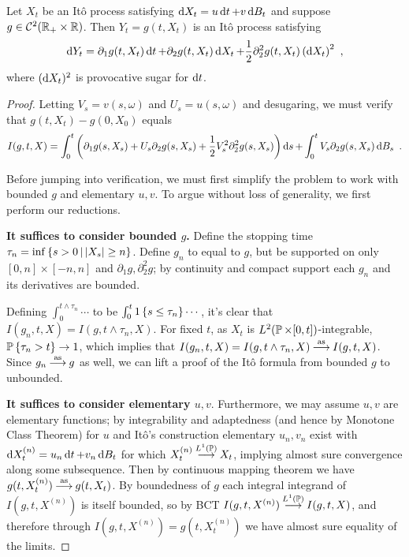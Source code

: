 \documentclass{article}
\begin{document}
\begin{theorem}
  Let \(X_t\) be an It\^{o} process satisfying \(\d{X_t}=u \d{t}+v\d{B_t}\) and suppose \(g\in\mcC^2(\R_+\times\R)\). Then \(Y_t=g(t, X_t)\) is an It\^{o} process satisfying
  \[
   \d{Y_t}=\partial_1g(t, X_t)\d{t}+\partial_2g(t, X_t)\d{X_t}+\frac{1}{2}\partial_2^2g(t, X_t)\pa{\d{X_t}}^2 \,\,,
  \]
  where \((\d{X_t})^2\) is provocative sugar for \(\d{t}\).
\end{theorem}
\begin{proof}
  Letting \(V_s=v(s, \omega)\) and \(U_s=u(s, \omega)\) and desugaring, we must verify that \(g(t, X_t)-g(0, X_0)\) equals
  \[
   I(g, t, X)=\int_0^t\pa{\partial_1g(s,X_s)+U_s\partial_2g(s, X_s)+\frac{1}{2}V_s^2\partial_2^2g(s, X_s)}\d{s}+\int_0^tV_s\partial_2g(s,X_s)\d{B_s}\,\,.
  \]

  Before jumping into verification, we must first simplify the problem to work with bounded \(g\) and elementary \(u,v\). To argue without loss of generality, we first perform our reductions.

  \textbf{It suffices to consider bounded \(g\).} Define the stopping time \(\tau_n=\inf\set{s>0}{\abs{X_s}\ge n}\). Define \(g_n\) to equal to \(g\), but be supported on only \([0,n]\times[-n,n]\) and \(\partial_1g,\partial_2^2g\); by continuity and compact support each \(g_n\) and its derivatives are bounded.

  Defining \(\int_0^{t\land \tau_n}\cdots\) to be \(\int_0^{t}1\ca{s\le \tau_n}\cdots\), it's clear that \(I(g_n, t, X)=I(g,t\land \tau_n, X)\). For fixed \(t\), as \(X_t\) is \(L^2(\P\times [0,t])\)-integrable, \(\P\ca{\tau_n>t}\rightarrow 1\), which implies that \(I(g_n,t, X)=I(g, t\land \tau_n, X)\convas I(g, t, X)\). Since \(g_n\convas g\) as well, we can lift a proof of the It\^{o} formula from bounded \(g\) to unbounded.

\textbf{It suffices to consider elementary \(u,v\)}.
Furthermore, we may assume \(u,v\) are elementary functions; by integrability and adaptedness (and hence by Monotone Class Theorem) for \(u\) and It\^{o}'s construction elementary \(u_n,v_n\) exist with \(\d{X_t^{(n)}}=u_n\d{t}+v_n\d{B_t}\) for which \(X_t^{(n)}\convarg{L^1(\P)} X_t\), implying almost sure convergence along some subsequence. Then by continuous mapping theorem we have \(g(t, X_t^{(n)})\convas g(t, X_t)\). By boundedness of \(g\) each integral integrand of \(I(g, t, X^{(n)})\) is itself bounded, so by BCT \(I(g, t, X^{(n)})\convarg{L^1(\P)}I(g, t, X)\), and therefore through \(I(g, t, X^{(n)})=g(t, X_t^{(n)})\) we have almost sure equality of the limits.


\end{proof}
\end{document}
